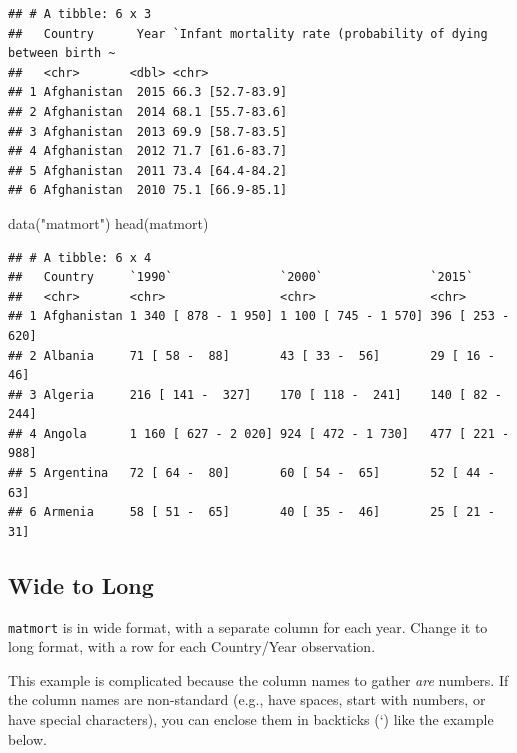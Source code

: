 \documentclass[
  oneside]{book}
\newenvironment{Shaded}{\begin{snugshade}}{\end{snugshade}}
\newcommand{\FunctionTok}[1]{\textcolor[rgb]{0.00,0.00,0.00}{#1}}
\newcommand{\NormalTok}[1]{#1}
\newcommand{\StringTok}[1]{\textcolor[rgb]{0.31,0.60,0.02}{#1}}
\begin{document}
\begin{verbatim}
## # A tibble: 6 x 3
##   Country      Year `Infant mortality rate (probability of dying between birth ~
##   <chr>       <dbl> <chr>                                                       
## 1 Afghanistan  2015 66.3 [52.7-83.9]                                            
## 2 Afghanistan  2014 68.1 [55.7-83.6]                                            
## 3 Afghanistan  2013 69.9 [58.7-83.5]                                            
## 4 Afghanistan  2012 71.7 [61.6-83.7]                                            
## 5 Afghanistan  2011 73.4 [64.4-84.2]                                            
## 6 Afghanistan  2010 75.1 [66.9-85.1]
\end{verbatim}

\begin{Shaded}
\begin{Highlighting}[]
\FunctionTok{data}\NormalTok{(}\StringTok{"matmort"}\NormalTok{)}
\FunctionTok{head}\NormalTok{(matmort)}
\end{Highlighting}
\end{Shaded}

\begin{verbatim}
## # A tibble: 6 x 4
##   Country     `1990`               `2000`               `2015`           
##   <chr>       <chr>                <chr>                <chr>            
## 1 Afghanistan 1 340 [ 878 - 1 950] 1 100 [ 745 - 1 570] 396 [ 253 -  620]
## 2 Albania     71 [ 58 -  88]       43 [ 33 -  56]       29 [ 16 -  46]   
## 3 Algeria     216 [ 141 -  327]    170 [ 118 -  241]    140 [ 82 -  244] 
## 4 Angola      1 160 [ 627 - 2 020] 924 [ 472 - 1 730]   477 [ 221 -  988]
## 5 Argentina   72 [ 64 -  80]       60 [ 54 -  65]       52 [ 44 -  63]   
## 6 Armenia     58 [ 51 -  65]       40 [ 35 -  46]       25 [ 21 -  31]
\end{verbatim}

\hypertarget{wide-to-long}{%
\subsection{Wide to Long}\label{wide-to-long}}

\texttt{matmort} is in wide format, with a separate column for each year. Change it to long format, with a row for each Country/Year observation.

This example is complicated because the column names to gather \emph{are} numbers. If the column names are non-standard (e.g., have spaces, start with numbers, or have special characters), you can enclose them in backticks (`) like the example below.
\end{document}
